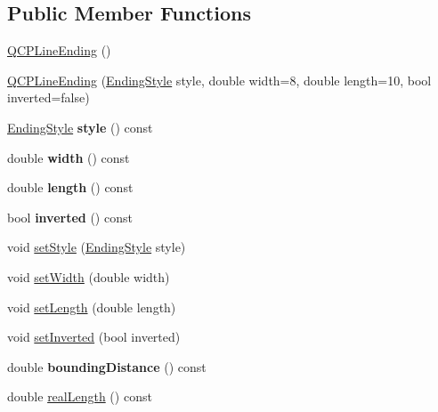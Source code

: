\subsection*{Public Member Functions}
\begin{DoxyCompactItemize}
\item 
\hyperlink{classQCPLineEnding_af2eaf8123b000d97fbd11929c669f61b}{Q\+C\+P\+Line\+Ending} ()
\item 
\hyperlink{classQCPLineEnding_abb2abc7542f0c7a3c081d878248896a4}{Q\+C\+P\+Line\+Ending} (\hyperlink{classQCPLineEnding_a5ef16e6876b4b74959c7261d8d4c2cd5}{Ending\+Style} style, double width=8, double length=10, bool inverted=false)
\item 
\mbox{\label{classQCPLineEnding_a07e75aaac6c61322bf51af237c5778e3}} 
\hyperlink{classQCPLineEnding_a5ef16e6876b4b74959c7261d8d4c2cd5}{Ending\+Style} {\bfseries style} () const
\item 
\mbox{\label{classQCPLineEnding_ae6f1fb83c210da6ace35d629993287f3}} 
double {\bfseries width} () const
\item 
\mbox{\label{classQCPLineEnding_aee9050a13fe115bd1b6794f9ad14cd72}} 
double {\bfseries length} () const
\item 
\mbox{\label{classQCPLineEnding_a15a68706d298a0c9f94556f6b4db15ff}} 
bool {\bfseries inverted} () const
\item 
void \hyperlink{classQCPLineEnding_a56953b9cb8ed1bed0f025c3935f16910}{set\+Style} (\hyperlink{classQCPLineEnding_a5ef16e6876b4b74959c7261d8d4c2cd5}{Ending\+Style} style)
\item 
void \hyperlink{classQCPLineEnding_a26dc020ea985a72cc25881ce2115e34e}{set\+Width} (double width)
\item 
void \hyperlink{classQCPLineEnding_ae36fa01763751cd64b7f56c3507e935a}{set\+Length} (double length)
\item 
void \hyperlink{classQCPLineEnding_a580e4e2360b35ebb8d68f3494aa2335d}{set\+Inverted} (bool inverted)
\item 
\mbox{\label{classQCPLineEnding_a14fe390ddd590864ac66a60ed5278df5}} 
double {\bfseries bounding\+Distance} () const
\item 
double \hyperlink{classQCPLineEnding_acacd24d386d459b282d3c57f16a5405d}{real\+Length} () const

\end{DoxyCompactItemize}
